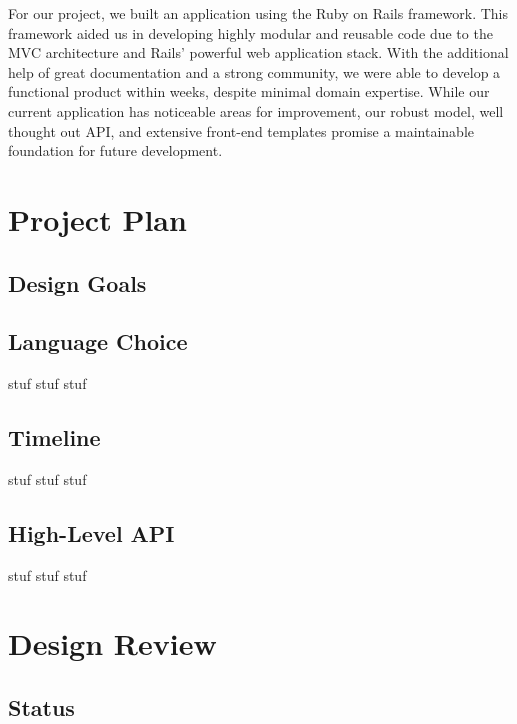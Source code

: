 \documentclass[11pt]{article}
\begin{document}
For our project, we built an application using the Ruby on Rails framework. This framework aided us in developing highly modular and reusable code due to the MVC architecture and Rails' powerful web application stack. With the additional help of great documentation and a strong community, we were able to develop a functional product within weeks, despite minimal domain expertise. While our current application has noticeable areas for improvement, our robust model, well thought out API, and extensive front-end templates promise a maintainable foundation for future development. 

\section{Project Plan}

\subsection{Design Goals}

% 

\subsection{Language Choice}




stuf stuf stuf

\subsection{Timeline}

stuf stuf stuf

\subsection{High-Level API}

stuf stuf stuf

\section{Design Review}

\subsection{Status}
\end{document}
